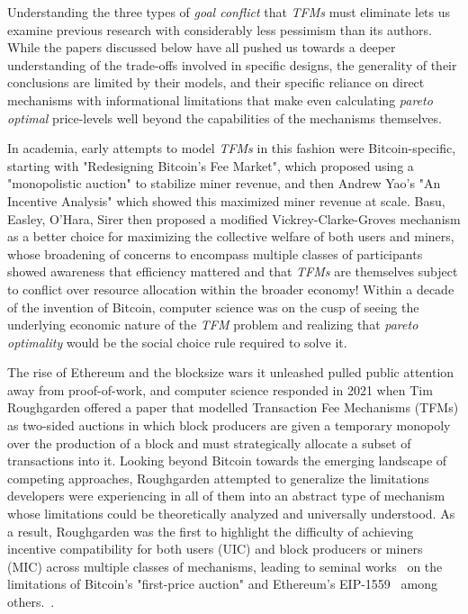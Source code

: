 
Understanding the three types of \textit{goal conflict} that \textit{TFMs} must eliminate lets us examine previous research with considerably less pessimism than its authors. While the papers discussed below have all pushed us towards a deeper understanding of the trade-offs involved in specific designs, the generality of their conclusions are limited by their models, and their specific reliance on direct mechanisms with informational limitations that make even calculating \textit{pareto optimal} price-levels well beyond the capabilities of the mechanisms themselves.

In academia, early attempts to model \textit{TFMs} in this fashion were Bitcoin-specific, starting with "Redesigning Bitcoin's Fee Market", which proposed using a "monopolistic auction" to stabilize miner revenue, and then Andrew Yao's "An Incentive Analysis" which showed this maximized miner revenue at scale. Basu, Easley, O’Hara, Sirer then proposed a modified Vickrey-Clarke-Groves mechanism as a better choice for maximizing the collective welfare of both users and miners, whose broadening of concerns to encompass multiple classes of participants showed awareness that efficiency mattered and that \textit{TFMs} are themselves subject to conflict over resource allocation within the broader economy! Within a decade of the invention of Bitcoin, computer science was on the cusp of seeing the underlying economic nature of the \textit{TFM} problem and realizing that \textit{pareto optimality} would be the social choice rule required to solve it.

The rise of Ethereum and the blocksize wars it unleashed pulled public attention away from proof-of-work, and computer science responded in 2021 when Tim Roughgarden\citet{roughgarden2021,roughgarden2024transaction} offered a paper that modelled Transaction Fee Mechanisms (TFMs) as two-sided auctions in which block producers are given a temporary monopoly over the production of a block and must strategically allocate a subset of transactions into it. Looking beyond Bitcoin towards the emerging landscape of competing approaches, Roughgarden attempted to generalize the limitations developers were experiencing in all of them into an abstract type of mechanism whose limitations could be theoretically analyzed and universally understood. As a result, Roughgarden was the first to highlight the difficulty of achieving incentive compatibility for both users (UIC) and block producers or miners (MIC) across multiple classes of mechanisms, leading to seminal works~\cite {roughgarden2021,roughgarden2024transaction} on the limitations of Bitcoin's "first-price auction" and Ethereum's EIP-1559~\cite{buterin2019eip} among others.~\cite{roughgarden2021,roughgarden2024transaction}.

